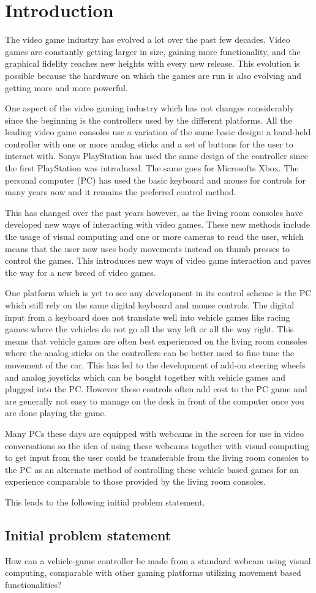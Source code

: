 \section{Introduction}
The video game industry has evolved a lot over the past few decades. Video games are constantly getting larger in size, gaining more functionality, and the graphical fidelity reaches new heights with every new release. This evolution is possible because the hardware on which the games are run is also evolving and getting more and more powerful.
\bigskip

One aspect of the video gaming industry which has not changes considerably since the beginning is the controllers used by the different platforms. All the leading video game consoles use a variation of the same basic design: a hand-held controller with one or more analog sticks and a set of buttons for the user to interact with. Sonys PlayStation has used the same design of the controller since the first PlayStation was introduced. The same goes for Microsofts Xbox. The personal computer (PC) has used the basic keyboard and mouse for controls for many years now and it remains the preferred control method.
\bigskip

This has changed over the past years however, as the living room consoles have developed new ways of interacting with video games. These new methods include the usage of visual computing and one or more cameras to read the user, which means that the user now uses body movements instead on thumb presses to control the games. This introduces new ways of video game interaction and paves the way for a new breed of video games.
\bigskip

One platform which is yet to see any development in its control scheme is the PC which still rely on the same digital keyboard and mouse controls. The digital input from a keyboard does not translate well into vehicle games like racing games where the vehicles do not go all the way left or all the way right. This means that vehicle games are often best experienced on the living room consoles where the analog sticks on the controllers can be better used to fine tune the movement of the car. This has led to the development of add-on steering wheels and analog joysticks which can be bought together with vehicle games and plugged into the PC. However these controls often add cost to the PC game and are generally not easy to manage on the desk in front of the computer once you are done playing the game.
\bigskip

Many PCs these days are equipped with webcams in the screen for use in video conversations so the idea of using these webcams together with visual computing to get input from the user could be transferable from the living room consoles to the PC as an alternate method of controlling these vehicle based games for an experience comparable to those provided by the living room consoles.

\noindent This leads to the following initial problem statement.

\subsection{Initial problem statement}
How can a vehicle-game controller be made from a standard webcam using visual computing, comparable with other gaming platforms utilizing movement based functionalities?
